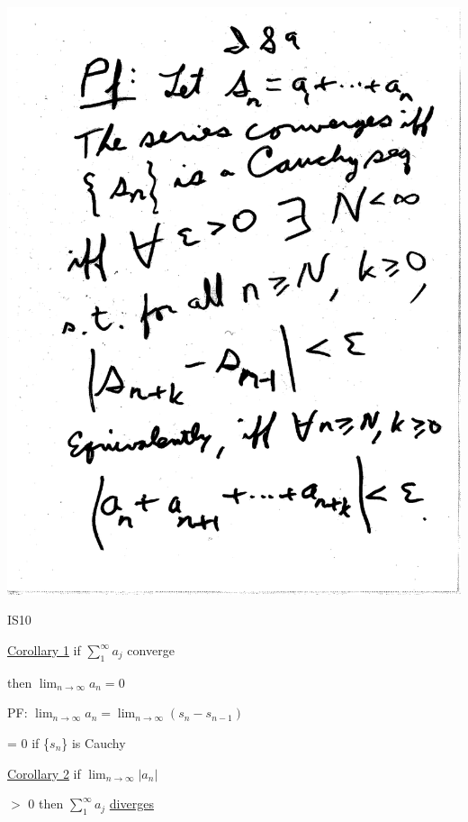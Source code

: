 \documentclass[10pt,a4paper]{article}
\begin{document}
\includegraphics[scale=.5]{Pages/IS_9}

\newpage

\begin{center}
IS10
\end{center}

\underline{Corollary 1} if $\sum_{1}^{\infty} a_j$ converge

then $\lim_{n\to\infty} a_n = 0$

PF: $\lim_{n\to\infty} a_n = \lim_{n\to\infty} (s_n - s_{n-1})$

= 0 if \{$s_n$\} is Cauchy

\underline{Corollary 2} if $\lim_{n\to\infty} |a_n|$

$>$ 0 then $\sum_{1}^{\infty} a_j$ \underline{diverges}
\end{document}
